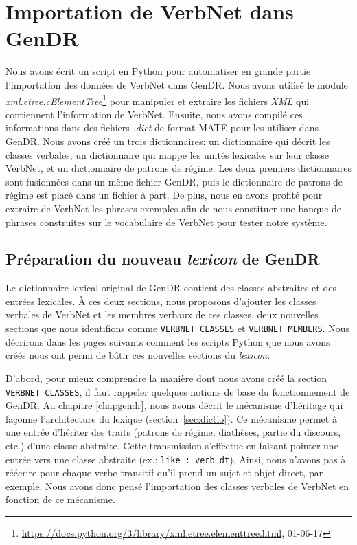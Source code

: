 
\chapter{Importation de VerbNet dans GenDR}\label{ch:python}

Nous avons écrit un script en Python pour automatiser en grande partie l'importation des données de VerbNet dans GenDR. Nous avons utilisé le module \emph{xml.etree.cElementTree}\footnote{\url{https://docs.python.org/3/library/xml.etree.elementtree.html}, 01-06-17} pour manipuler et extraire les fichiers \emph{XML} qui contiennent l'information de VerbNet. Ensuite, nous avons compilé ces informations dans des fichiers \emph{.dict} de format MATE pour les utiliser dans GenDR. Nous avons créé un trois dictionnaires: un dictionnaire qui décrit les classes verbales, un dictionnaire qui mappe les unités lexicales sur leur classe VerbNet, et un dictionnaire de patrons de régime. Les deux premiers dictionnaires sont fusionnées dans un même fichier GenDR, puis le dictionnaire de patrons de régime est placé dans un fichier à part. De plus, nous en avons profité pour extraire de VerbNet les phrases exemples afin de nous constituer une banque de phrases construites sur le vocabulaire de VerbNet pour tester notre système.
 
\section{Préparation du nouveau \emph{lexicon} de GenDR}

Le dictionnaire lexical original de GenDR contient des classes abstraites et des entrées lexicales. À ces deux sections, nous proposons d'ajouter les classes verbales de VerbNet et les membres verbaux de ces classes, deux nouvelles sections que nous identifions comme \texttt{VERBNET CLASSES} et \texttt{VERBNET MEMBERS}. Nous décrirons dans les pages suivants comment les scripts Python que nous avons créés nous ont permi de bâtir ces nouvelles sections du \emph{lexicon}.

D'abord, pour mieux comprendre la manière dont nous avons créé la section \texttt{VERBNET CLASSES}, il faut rappeler quelques notions de base du fonctionnement de GenDR. Au chapitre \ref{chapgendr}, nous avons décrit le mécanisme d'héritage qui façonne l'architecture du lexique (section~\ref{sec:dictio}). 
Ce mécanisme permet à une entrée d'hériter des traits (patrons de régime, diathèses, partie du discours, etc.) d'une classe abstraite. Cette transmission s'effectue en faisant pointer une entrée vers une classe abstraite (ex.: \texttt{like : verb\_dt}). Ainsi, nous n'avons pas à réécrire pour chaque verbe transitif qu'il prend un sujet et objet direct, par exemple. Nous avons donc pensé l'importation des classes verbales de VerbNet en fonction de ce mécanisme.  


